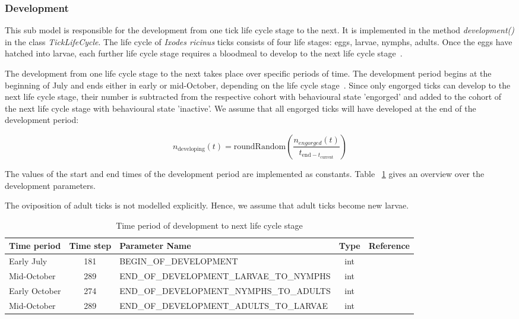 \documentclass[a4paper, 11pt]{scrartcl}
\begin{document}
\subsubsection{Development}
This sub model is responsible for the development from one tick life cycle stage to the next. It is implemented in the method \textit{development()} in the class
\textit{TickLifeCycle}. The life cycle of \textit{Ixodes ricinus} ticks consists of four life stages: eggs, larvae, nymphs, adults. Once the eggs have hatched into larvae, each
further life cycle stage requires a bloodmeal to develop to the next life cycle stage~\parencite{tba}.

The development from one life cycle stage to the next takes place over specific periods of time. The development period begins at the beginning of July and ends either in early
or mid-October, depending on the life cycle stage~\parencite{tba}. Since only engorged ticks can develop to the next life cycle stage, their number is subtracted from the
respective cohort with behavioural state 'engorged' and added to the cohort of the next life cycle stage with behavioural state 'inactive'. We assume that all engorged ticks will have
developed at the end of the development period:

\begin{equation}
n_{\text{developing}}(t) = \text{roundRandom}(\frac{n_{engorged}(t)}{t_{\text{end} - t_{\text{current}}}})
\end{equation}

The values of the start and end times of the development period are implemented as constants. Table ~\ref{tab:development_parameters} gives an overview over the
development parameters.

The oviposition of adult ticks is not modelled explicitly. Hence, we assume that adult ticks become new larvae.

\begin{table}[h!]
\caption{Time period of development to next life cycle stage}
\label{tab:development_parameters}
\begin{tabularx}{\textwidth}{lclcl}
\toprule
\textbf{Time period} 	& \textbf{Time step} & \textbf{Parameter Name}							& \textbf{Type}    & \textbf{Reference} \\
\midrule
Early July   			& 181   			 & \tiny{BEGIN\_OF\_DEVELOPMENT}					& int      & ~\cite{tba}   		\\
Mid-October     		& 289      			 & \tiny{END\_OF\_DEVELOPMENT\_LARVAE\_TO\_NYMPHS}	& int      & ~\cite{tba}      	\\
Early October    		& 274    			 & \tiny{END\_OF\_DEVELOPMENT\_NYMPHS\_TO\_ADULTS}	& int      & ~\cite{tba}     	\\
Mid-October     		& 289      			 & \tiny{END\_OF\_DEVELOPMENT\_ADULTS\_TO\_LARVAE}	& int      & ~\cite{tba}        \\
\bottomrule
\end{tabularx}
\end{table}
\end{document}

